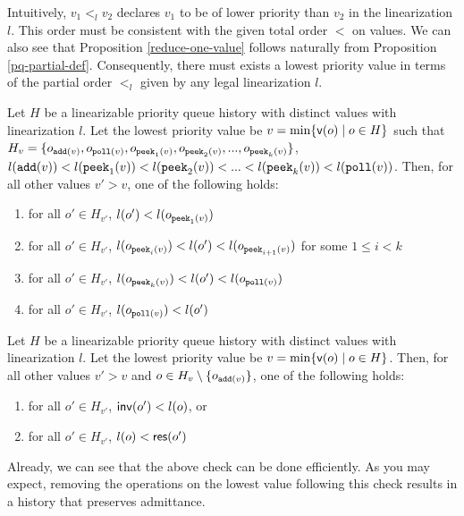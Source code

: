 Intuitively, $v_1 <_l v_2$ declares $v_1$ to be of lower priority than $v_2$ in the linearization $l$. This order must be consistent with the given total order $<$ on values. We can also see that Proposition \ref{reduce-one-value} follows naturally from Proposition \ref{pq-partial-def}. Consequently, there must exists a lowest priority value in terms of the partial order $<_l$ given by any legal linearization $l$.

\begin{corollary}
    Let $H$ be a linearizable priority queue history with distinct values with linearization $l$. Let the lowest priority value be $v = \min\{{\sf v}(o) \;|\; o\in H\}$ such that $H_v = \{o_{{\tt add}(v)}, o_{{\tt poll}(v)}, o_{{\tt peek}_1(v)}, \allowbreak o_{{\tt peek}_2(v)}, ..., o_{{\tt peek}_k(v)}\}$, $l({\tt add}(v)) < l({\tt peek}_1(v)) < l({\tt peek}_2(v)) < ... < l({\tt peek}_k(v)) < l({\tt poll}(v))$. Then, for all other values $v' > v$, one of the following holds:
    \begin{enumerate}
        \item for all $o' \in H_{v'}$, $l(o') < l(o_{{\tt peek}_1(v)})$
        \item for all $o' \in H_{v'}$, $l(o_{{\tt peek}_i(v)}) < l(o') < l(o_{{\tt peek}_{i+1}(v)})$ for some $1 \leq i < k$
        \item for all $o' \in H_{v'}$, $l(o_{{\tt peek}_k(v)}) < l(o') < l(o_{{\tt poll}(v)})$
        \item for all $o' \in H_{v'}$, $l(o_{{\tt poll}(v)}) < l(o')$
    \end{enumerate}
\end{corollary}

\begin{corollary}\label{pqueue-low-cor}
    Let $H$ be a linearizable priority queue history with distinct values with linearization $l$. Let the lowest priority value be $v = \min\{{\sf v}(o) \;|\; o\in H\}$. Then, for all other values $v' > v$ and $o \in H_v \setminus \{o_{{\tt add}(v)}\}$, one of the following holds:
    \begin{enumerate}
        \item for all $o' \in H_{v'}$, ${\sf inv}(o') < l(o)$, or
        \item for all $o' \in H_{v'}$, $l(o) < {\sf res}(o')$
    \end{enumerate}
\end{corollary}

Already, we can see that the above check can be done efficiently. As you may expect, removing the operations on the lowest value following this check results in a history that preserves admittance.


